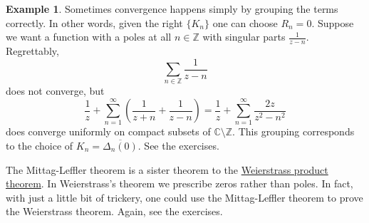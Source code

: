 \documentclass[12pt,openany]{book}
\newcommand{\C}{{\mathbb{C}}}
\newcommand{\Z}{{\mathbb{Z}}}
\theoremstyle{plain}
\theoremstyle{remark}
\theoremstyle{definition}
\theoremstyle{exercise}
\theoremstyle{example}
\newtheorem{example}[thm]{Example}
\begin{document}
\begin{example}
Sometimes convergence happens simply by grouping the terms correctly.
In other words, given the right $\{ K_n \}$ one can choose $R_n = 0$.  
Suppose we want a function with a poles at all $n \in \Z$ with
singular parts $\frac{1}{z-n}$.  Regrettably,
\begin{equation*}
\sum_{n\in \Z} \frac{1}{z-n}
\end{equation*}
does not converge, but
\begin{equation*}
\frac{1}{z} + 
\sum_{n=1}^\infty
\left(
\frac{1}{z+n} + 
\frac{1}{z-n}
\right)
=
\frac{1}{z}
+
\sum_{n=1}^\infty
\frac{2z}{z^2-n^2}
\end{equation*}
does converge uniformly on compact subsets of $\C \setminus \Z$.
This grouping corresponds to the choice of $K_n =
\overline{\Delta_n(0)}$.  See the exercises.
\end{example}

The Mittag-Leffler theorem is a sister theorem to
the
\hyperref[thm:weierprod]{Weierstrass product theorem}.
In Weierstrass's theorem
we prescribe zeros rather than poles.  In fact, with just a little bit
of trickery, one could use the Mittag-Leffler theorem to prove
the Weierstrass theorem.  Again, see the exercises.
\end{document}
